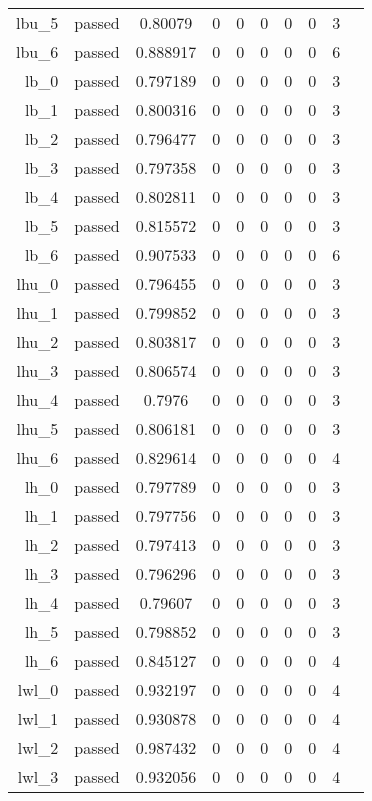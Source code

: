 \begin{longtable}{r|ccccccccc}
    lbu\_5 & passed & 0.80079 & 0 & 0 & 0 & 0 & 0 & 3 \\
    lbu\_6 & passed & 0.888917 & 0 & 0 & 0 & 0 & 0 & 6 \\
    lb\_0 & passed & 0.797189 & 0 & 0 & 0 & 0 & 0 & 3 \\
    lb\_1 & passed & 0.800316 & 0 & 0 & 0 & 0 & 0 & 3 \\
    lb\_2 & passed & 0.796477 & 0 & 0 & 0 & 0 & 0 & 3 \\
    lb\_3 & passed & 0.797358 & 0 & 0 & 0 & 0 & 0 & 3 \\
    lb\_4 & passed & 0.802811 & 0 & 0 & 0 & 0 & 0 & 3 \\
    lb\_5 & passed & 0.815572 & 0 & 0 & 0 & 0 & 0 & 3 \\
    lb\_6 & passed & 0.907533 & 0 & 0 & 0 & 0 & 0 & 6 \\
    lhu\_0 & passed & 0.796455 & 0 & 0 & 0 & 0 & 0 & 3 \\
    lhu\_1 & passed & 0.799852 & 0 & 0 & 0 & 0 & 0 & 3 \\
    lhu\_2 & passed & 0.803817 & 0 & 0 & 0 & 0 & 0 & 3 \\
    lhu\_3 & passed & 0.806574 & 0 & 0 & 0 & 0 & 0 & 3 \\
    lhu\_4 & passed & 0.7976 & 0 & 0 & 0 & 0 & 0 & 3 \\
    lhu\_5 & passed & 0.806181 & 0 & 0 & 0 & 0 & 0 & 3 \\
    lhu\_6 & passed & 0.829614 & 0 & 0 & 0 & 0 & 0 & 4 \\
    lh\_0 & passed & 0.797789 & 0 & 0 & 0 & 0 & 0 & 3 \\
    lh\_1 & passed & 0.797756 & 0 & 0 & 0 & 0 & 0 & 3 \\
    lh\_2 & passed & 0.797413 & 0 & 0 & 0 & 0 & 0 & 3 \\
    lh\_3 & passed & 0.796296 & 0 & 0 & 0 & 0 & 0 & 3 \\
    lh\_4 & passed & 0.79607 & 0 & 0 & 0 & 0 & 0 & 3 \\
    lh\_5 & passed & 0.798852 & 0 & 0 & 0 & 0 & 0 & 3 \\
    lh\_6 & passed & 0.845127 & 0 & 0 & 0 & 0 & 0 & 4 \\
    lwl\_0 & passed & 0.932197 & 0 & 0 & 0 & 0 & 0 & 4 \\
    lwl\_1 & passed & 0.930878 & 0 & 0 & 0 & 0 & 0 & 4 \\
    lwl\_2 & passed & 0.987432 & 0 & 0 & 0 & 0 & 0 & 4 \\
    lwl\_3 & passed & 0.932056 & 0 & 0 & 0 & 0 & 0 & 4 \\

\end{longtable}
